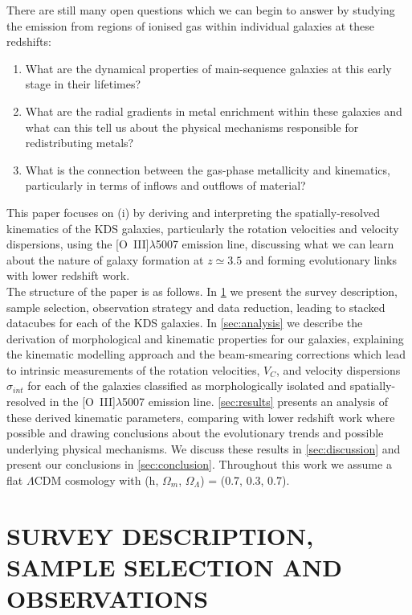 \documentclass[fleqn,usenatbib]{mnras}
\begin{document}
There are still many open questions which we can begin to answer by studying the emission from regions of ionised gas within individual galaxies at these redshifts: 
\begin{enumerate}[label=(\roman*),align=left]
\item What are the dynamical properties of main-sequence galaxies at this early stage in their lifetimes?
\item  What are the radial gradients in metal enrichment within these galaxies and what can this tell us about the physical mechanisms responsible for redistributing metals?
\item What is the connection between the gas-phase metallicity and  kinematics, particularly in terms of inflows and outflows of material?
\end{enumerate}

This paper focuses on (i) by deriving and interpreting the spatially-resolved kinematics of the KDS galaxies, particularly the rotation velocities and velocity dispersions, using the [O~{\sc III}]$\lambda$5007 emission line, discussing what we can learn about the nature of galaxy formation at $z\simeq3.5$ and forming evolutionary links with lower redshift work. \\

\noindent
The structure of the paper is as follows.
In \cref{sec:Survey_and_data} we present the survey description, sample selection, observation strategy and data reduction, leading to stacked datacubes for each of the KDS galaxies.
In \cref{sec:analysis} we describe the derivation of morphological and kinematic properties for our galaxies, explaining the kinematic modelling approach and the beam-smearing corrections which lead to intrinsic measurements of the rotation velocities, $V_{C}$, and velocity dispersions $\sigma_{int}$ for each of the galaxies classified as morphologically isolated and spatially-resolved in the [O~{\sc III}]$\lambda$5007 emission line.
\cref{sec:results} presents an analysis of these derived kinematic parameters, comparing with lower redshift work where possible and drawing conclusions about the evolutionary trends and possible underlying physical mechanisms.
We discuss these results in \cref{sec:discussion} and present our conclusions in \cref{sec:conclusion}.
Throughout this work we assume a flat $\Lambda$CDM cosmology with (h, $\Omega_{m}$, $\Omega_{\Lambda}$) = (0.7, 0.3, 0.7). 

\section{SURVEY DESCRIPTION, SAMPLE SELECTION AND OBSERVATIONS}\label{sec:Survey_and_data}
\end{document}
